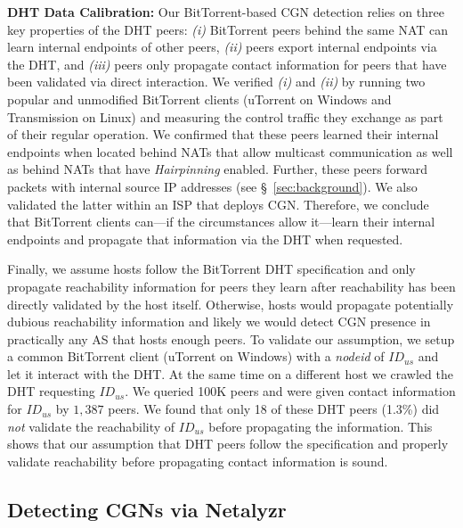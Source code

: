 \documentclass[10pt]{sig-alternate-05-2015}
\newcommand\xref[1]{\S~\ref{#1}}
\newcommand{\parax}[1]{\vspace{0.2em} \noindent \textbf{#1:}}
\newcommand{\btnodeid}{\textit{nodeid}\xspace}
\begin{document}
\parax{DHT Data Calibration} Our BitTorrent-based CGN detection
relies on three key properties of the DHT peers: \textit{(i)}
BitTorrent peers behind the same NAT can learn internal endpoints of
other peers, \textit{(ii)} peers export internal endpoints via the
DHT, and \textit{(iii)} peers only propagate contact information for
peers that have been validated via direct interaction.  We verified
\textit{(i)} and \textit{(ii)} by running two popular and unmodified
BitTorrent clients (uTorrent on Windows and Transmission on Linux)
and measuring the control traffic they exchange as part of their
regular operation. We confirmed that these peers learned their
internal endpoints when located behind NATs that allow multicast
communication as well as behind NATs that have \textit{Hairpinning}
enabled.  Further, these peers forward packets with internal source
IP addresses (see \xref{sec:background}). We also validated the
latter within an ISP that deploys CGN. Therefore, we conclude that
BitTorrent clients can---if the circumstances allow it---learn their
internal endpoints and propagate that information via the DHT when
requested.

Finally, we assume hosts follow the BitTorrent DHT specification
\cite{bittorrent_dht} and only propagate reachability information for peers they
learn after reachability has been directly validated by the host
itself.  Otherwise, hosts would propagate potentially dubious
reachability information and likely we would detect 
CGN presence in practically any AS that hosts enough peers.  To
validate our assumption, we setup a common BitTorrent client  
(uTorrent on Windows) with a \btnodeid of $ID_{us}$ and let it
interact with the DHT.  At the same time on a different host we
crawled the DHT requesting $ID_{us}$.  We queried 100K peers and
were given contact information for $ID_{us}$ by $1,387$ peers.  We
found that only 18 of these DHT peers (1.3\%) did \textit{not}
validate the reachability of $ID_{us}$ before propagating the
information.  This shows that our assumption that DHT peers follow
the specification and properly validate reachability before
propagating contact information is sound.  



\subsection{Detecting CGNs via Netalyzr}
\label{sec:cgndetection:neta}
\end{document}
